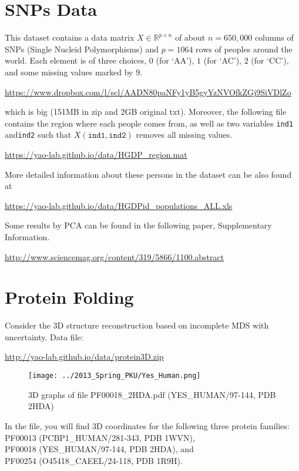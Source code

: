 \documentclass[11pt]{article}
\def\R{{\mathbb R}}
\begin{document}
\section{SNPs Data}
 This dataset contains a data matrix $X\in \R^{p\times n}$ of about $n=650,000$ columns of SNPs (Single Nucleid Polymorphisms) and $p=1064$ rows of peoples around the world. Each element is of three choices, $0$ (for `AA'), $1$ (for `AC'), $2$ (for `CC'), and some missing values marked by $9$. 

\url{https://www.dropbox.com/l/scl/AADN80paNFy1yB5gyYzNVOfkZGj9SiVDlZo}

\noindent which is big (151MB in zip and 2GB original txt). Moreover, the following file contains the region where each people comes from, as well as two variables {\texttt{ind1}} and{\texttt{ind2}} such that $X({\texttt{ind1}},{\texttt{ind2}})$ removes all missing values. 

\url{https://yao-lab.github.io/data/HGDP_region.mat}

\noindent More detailed information about these persons in the dataset can be also found at

\url{https://yao-lab.github.io/data/HGDPid_populations_ALL.xls}

Some results by PCA can be found in the following paper, Supplementary Information. 

\url{http://www.sciencemag.org/content/319/5866/1100.abstract}

\section{Protein Folding} 
Consider the 3D structure reconstruction based on incomplete MDS with uncertainty. Data file: 

\url{http://yao-lab.github.io/data/protein3D.zip}

\begin{figure}[htbp]
\begin{center}
\texttt{[image: ../2013\_Spring\_PKU/Yes\_Human.png]}  
\caption{3D graphs of file PF00018\_2HDA.pdf (YES\_HUMAN/97-144, PDB 2HDA)}
\label{yes_human}
\end{center}
\end{figure}

\noindent In the file, you will find 3D coordinates for the following three protein families: 
\subitem PF00013 (PCBP1\_HUMAN/281-343, PDB 1WVN), \\
\subitem PF00018 (YES\_HUMAN/97-144, PDB 2HDA), and \\
\subitem PF00254 (O45418\_CAEEL/24-118, PDB 1R9H). \\
\end{document}
